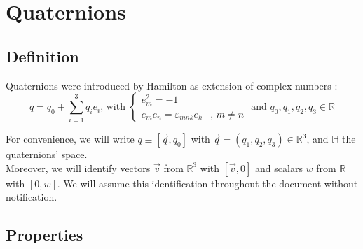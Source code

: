 \documentclass[class=report, float=false, crop=false]{standalone}
\begin{document}
\chapter{Quaternions}
\label{appendix:quaternions}

\section{Definition}

Quaternions were introduced by Hamilton as extension of complex numbers \cite{shoemake}:
\begin{equation}
q = q_0 + \sum_{i=1}^{3}q_i e_i\text{, with } \begin{cases} e_m^2 = -1& \\ e_me_n = \varepsilon_{mnk} e_k&\text{, } m \neq n \end{cases} \text{ and } q_0,q_1,q_2,q_3 \in \mathbb{R}
\end{equation}

For convenience, we will write $q \equiv [\vec{q},q_0]$ with $\vec{q} = (q_1,q_2,q_3) \in \mathbb{R}^3$, and $\mathbb{H}$ the quaternions' space.\\

Moreover, we will identify vectors $\vec{v}$ from $\mathbb{R}^3$ with $[\vec{v},0]$ and scalars $w$ from $\mathbb{R}$ with $[0,w]$. We will assume this identification throughout the document without notification.

\section{Properties}
\label{quat_properties}
\end{document}
